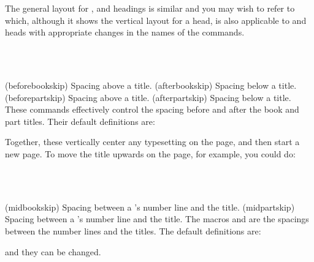     The general layout for \cmd{\book}, \cmd{\part} and \cmd{\chapter} headings
is similar and you may wish to refer to  which, although
it shows the vertical layout for a  head, is also applicable
to \cmd{\book} and \cmd{\part} heads with appropriate changes in the
names of the commands.


\begin{syntax}
\cmd{\beforebookskip} \cmd{\afterbookskip} \\
\cmd{\beforepartskip} \cmd{\afterpartskip} \\
\end{syntax}
\glossary(beforebookskip)%
  {}%
  {Spacing above a  title.}
\glossary(afterbookskip)%
  {}%
  {Spacing below a  title.}
\glossary(beforepartskip)%
  {}%
  {Spacing above a  title.}
\glossary(afterpartskip)%
  {}%
  {Spacing below a  title.}
These commands effectively control the spacing before and after the book
and  part titles. Their default definitions are:
\begin{lcode}
\newcommand*{\beforebookskip}{\null\vfil}
\newcommand*{\afterbookskip}{\vfil\newpage}
\newcommand*{\beforepartskip}{\null\vfil}
\newcommand*{\afterpartskip}{\vfil\newpage}
\end{lcode}
Together, these vertically center any typesetting on the page, and then start
a new page. To move the  title upwards on the page, for example,
you could do:
\begin{lcode}
\renewcommand*{\beforepartskip}{\null\vskip 0pt plus 0.3fil}
\renewcommand*{\afterpartskip}{\vskip 0pt plus 0.7fil \newpage}
\end{lcode}

\begin{syntax}
\cmd{\midbookskip} \\
\cmd{\midpartskip} \\
\end{syntax}
\glossary(midbookskip)%
  {}%
  {Spacing between a 's number line and the title.}
\glossary(midpartskip)%
  {}%
  {Spacing between a 's number line and the title.}
The macros \cmd{\midbookskip} and \cmd{\midpartskip} are the spacings
between the number lines and the titles. The default definitions are:
\begin{lcode}
\newcommand{\midbookskip}{\par\vspace 2\onelineskip}
\newcommand{\midpartskip}{\par\vspace 2\onelineskip}
\end{lcode}
and they can be changed.

